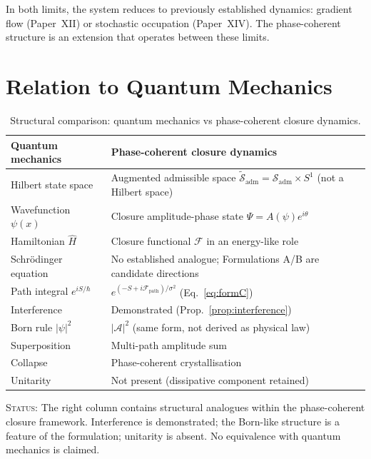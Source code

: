 \documentclass[12pt]{article}
\newcommand{\Fcal}{\mathcal{F}}
\newcommand{\Sadm}{\mathcal{S}_{\mathrm{adm}}}
\begin{document}
In both limits, the system reduces to previously established dynamics: gradient flow (Paper~XII) or stochastic occupation (Paper~XIV). The phase-coherent structure is an extension that operates between these limits.

\section{Relation to Quantum Mechanics}\label{sec:QM}

\begin{table}[ht]
\centering
\caption{Structural comparison: quantum mechanics vs phase-coherent closure dynamics.}
\label{tab:QMcomparison}
\begin{tabular}{@{}ll@{}}
\toprule
Quantum mechanics & Phase-coherent closure dynamics \\
\midrule
Hilbert state space & Augmented admissible space $\tilde{\mathcal{S}}_{\mathrm{adm}} = \Sadm \times S^1$ (not a Hilbert space) \\
Wavefunction $\psi(x)$ & Closure amplitude-phase state $\Psi = A(\psi)e^{i\theta}$ \\
Hamiltonian $\hat{H}$ & Closure functional $\Fcal$ in an energy-like role \\
Schr\"odinger equation & No established analogue; Formulations A/B are candidate directions \\
Path integral $e^{iS/\hbar}$ & $e^{(-S + i\Fcal_{\mathrm{path}})/\sigma^2}$ (Eq.~\ref{eq:formC}) \\
Interference & Demonstrated (Prop.~\ref{prop:interference}) \\
Born rule $|\psi|^2$ & $|\mathcal{A}|^2$ (same form, not derived as physical law) \\
Superposition & Multi-path amplitude sum \\
Collapse & Phase-coherent crystallisation \\
Unitarity & Not present (dissipative component retained) \\
\bottomrule
\end{tabular}
\end{table}

\textsc{Status:} The right column contains structural analogues within the phase-coherent closure framework. Interference is demonstrated; the Born-like structure is a feature of the formulation; unitarity is absent. No equivalence with quantum mechanics is claimed.
\end{document}
